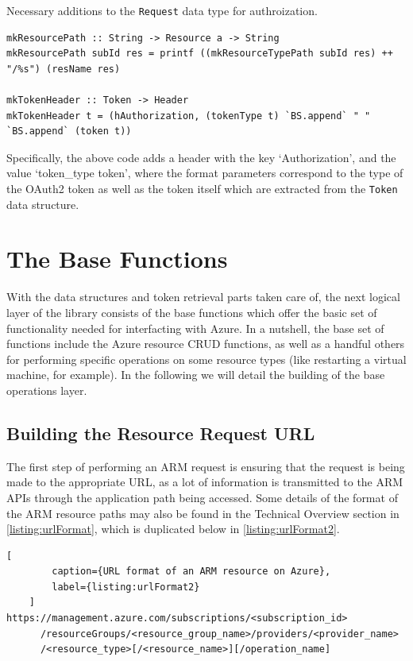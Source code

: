\documentclass[11pt]{report}
\begin{document}
\begin{listing}[H]
\label{listing:authorizationHeaderHaskell}
\caption{Necessary additions to the \texttt{Request} data type for authroization.}
\begin{verbatim}
mkResourcePath :: String -> Resource a -> String
mkResourcePath subId res = printf ((mkResourceTypePath subId res) ++ "/%s") (resName res)

mkTokenHeader :: Token -> Header
mkTokenHeader t = (hAuthorization, (tokenType t) `BS.append` " " `BS.append` (token t))
\end{verbatim}
\end{listing}

Specifically, the above code adds a header with the key `Authorization', and
the value `token\_type token', where the format parameters correspond to
the type of the OAuth2 token as well as the token itself which are extracted
from the \texttt{Token} data structure.

\section{The Base Functions}

With the data structures and token retrieval parts taken care of, the next
logical layer of the library consists of the base functions which offer the
basic set of functionality needed for interfacting with Azure. In a nutshell,
the base set of functions include the Azure resource CRUD functions, as well as
a handful others for performing specific operations on some resource types (like
restarting a virtual machine, for example). In the following we will detail the
building of the base operations layer.

\subsection{Building the Resource Request URL}

The first step of performing an ARM request is ensuring that the request is
being made to the appropriate URL, as a lot of information is transmitted to
the ARM APIs through the application path being accessed. Some details of
the format of the ARM resource paths may also be found in the Technical Overview
section in \autoref{listing:urlFormat}, which is duplicated below in
\autoref{listing:urlFormat2}.

\begin{lstlisting}[
        caption={URL format of an ARM resource on Azure},
        label={listing:urlFormat2}
    ]
https://management.azure.com/subscriptions/<subscription_id>
      /resourceGroups/<resource_group_name>/providers/<provider_name>
      /<resource_type>[/<resource_name>][/operation_name]
\end{lstlisting}
\end{document}
